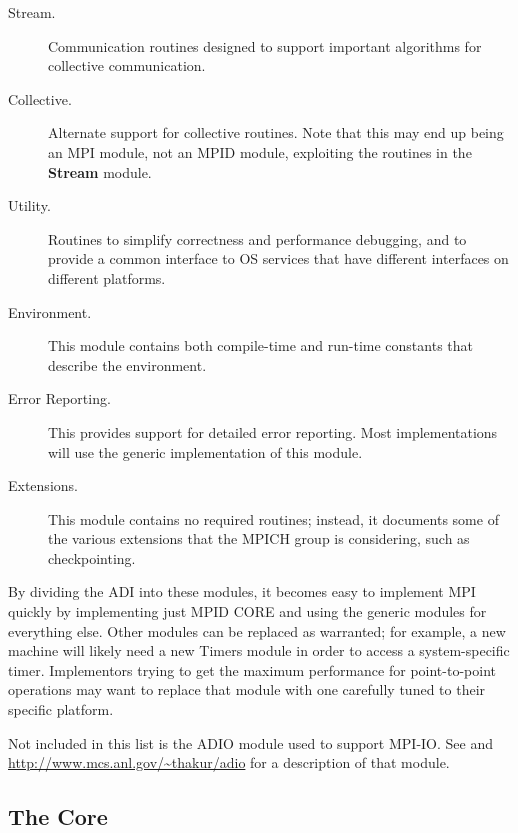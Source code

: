 \documentclass[dvipdfm]{article}
\begin{document}
\begin{description}
\item[Stream.] Communication routines designed to support
important algorithms for collective communication.

\item[Collective.] Alternate support for collective
routines. Note that this may end up being an MPI module, not
an MPID module, exploiting the routines in the \textbf{Stream} module.

\item[Utility.] Routines to simplify correctness and performance
debugging, and to provide a common interface to OS services that have
different interfaces on different platforms.

\item[Environment.] This module contains both compile-time and run-time
constants that describe the environment. 


\item[Error Reporting.] This provides support for detailed error
reporting.  Most implementations will use the generic implementation
of this module.

\item[Extensions.] This module contains no required routines; instead,
it documents some of the various extensions that the MPICH group is
considering, such as checkpointing.
\end{description}

By dividing the ADI into these modules, it becomes easy to implement
MPI quickly by implementing just MPID CORE and using the generic
modules for everything else.  Other modules can be replaced as
warranted; for example, a new machine will likely need a new Timers
module in order to access a system-specific timer.  Implementors
trying to get the maximum performance for point-to-point operations
may want to replace that module with one carefully tuned to their
specific platform.

Not included in this list is the ADIO module used to support MPI-IO.
See \cite{ThakurGroLus96} and \url{http://www.mcs.anl.gov/~thakur/adio} 
for a description of that module.

\subsection{The Core}
\label{sec-minimal}
\end{document}
